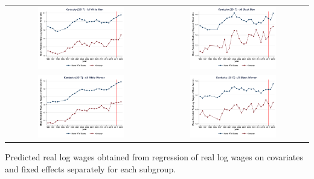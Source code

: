 \documentclass[11pt]{article}
\begin{document}
{\pagebreak
\begin{landscape}
\begin{table}[h!]
    \centering
    \label{fig:pta_ky}
    \begin{tabular}{c c}
          \includegraphics[width = 0.6\textwidth, keepaspectratio]{figures/pta/fin_wm_ky.png} & \includegraphics[width = 0.6\textwidth, keepaspectratio]{figures/pta/fin_bm_ky.png} \\
          \includegraphics[width = 0.6\textwidth, keepaspectratio]{figures/pta/fin_wf_ky.png} & \includegraphics[width = 0.6\textwidth, keepaspectratio]{figures/pta/fin_bf_ky.png}
    \end{tabular}
\end{table}
\footnotesize{Predicted real log wages obtained from regression of real log wages on covariates and fixed effects separately for each subgroup.}
\end{landscape}

}
\end{document}

